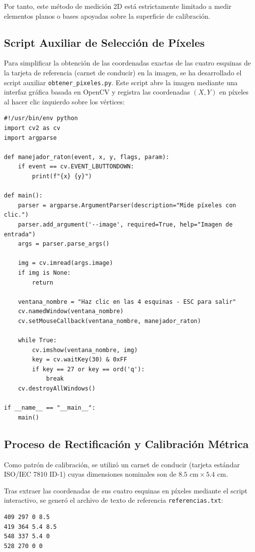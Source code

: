 \documentclass[12pt,a4paper]{article}
\begin{document}
Por tanto, este método de medición 2D está estrictamente limitado a medir elementos planos o bases apoyadas sobre la superficie de calibración.

\subsection{Script Auxiliar de Selección de Píxeles}

Para simplificar la obtención de las coordenadas exactas de las cuatro esquinas de la tarjeta de referencia (carnet de conducir) en la imagen, se ha desarrollado el script auxiliar \texttt{obtener\_pixeles.py}. Este script abre la imagen mediante una interfaz gráfica basada en OpenCV y registra las coordenadas $(X, Y)$ en píxeles al hacer clic izquierdo sobre los vértices:

\begin{verbatim}
#!/usr/bin/env python
import cv2 as cv
import argparse

def manejador_raton(event, x, y, flags, param):
    if event == cv.EVENT_LBUTTONDOWN:
        print(f"{x} {y}")

def main():
    parser = argparse.ArgumentParser(description="Mide píxeles con clic.")
    parser.add_argument('--image', required=True, help="Imagen de entrada")
    args = parser.parse_args()

    img = cv.imread(args.image)
    if img is None:
        return

    ventana_nombre = "Haz clic en las 4 esquinas - ESC para salir"
    cv.namedWindow(ventana_nombre)
    cv.setMouseCallback(ventana_nombre, manejador_raton)

    while True:
        cv.imshow(ventana_nombre, img)
        key = cv.waitKey(30) & 0xFF
        if key == 27 or key == ord('q'):
            break
    cv.destroyAllWindows()

if __name__ == "__main__":
    main()
\end{verbatim}

\subsection{Proceso de Rectificación y Calibración Métrica}

Como patrón de calibración, se utilizó un carnet de conducir (tarjeta estándar ISO/IEC 7810 ID-1) cuyas dimensiones nominales son de \textbf{$8.5\text{ cm} \times 5.4\text{ cm}$}. 

Tras extraer las coordenadas de sus cuatro esquinas en píxeles mediante el script interactivo, se generó el archivo de texto de referencia \texttt{referencias.txt}:
\begin{verbatim}
409 297 0 8.5
419 364 5.4 8.5
548 337 5.4 0
528 270 0 0
\end{verbatim}
\end{document}
